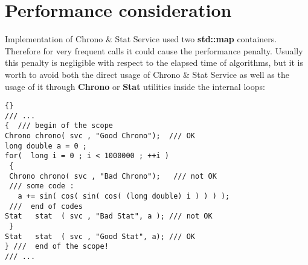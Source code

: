 \documentclass{lhcbnote}
\newcommand{\bftt}         {\ttfamily\bfseries}
\begin{document}
\chapter{Performance consideration  }
Implementation of Chrono \& Stat Service used two {\bftt{ std::map}}
containers. Therefore for very frequent calls it could cause the
performance penalty.  Usually this penalty  is negligible with respect to the
elapsed time of algorithms, but it is worth to avoid both the direct usage
of Chrono \& Stat Service as well as the  usage of it
through {\bftt{Chrono}} or {\bftt{Stat}} utilities inside the
internal loops:

\begin{lstlisting}{}
/// ...
{  /// begin of the scope
Chrono chrono( svc , "Good Chrono");  /// OK
long double a = 0 ;
for(  long i = 0 ; i < 1000000 ; ++i )
 {
 Chrono chrono( svc , "Bad Chrono");   /// not OK
 /// some code :
   a += sin( cos( sin( cos( (long double) i ) ) ) );
 ///  end of codes
Stat   stat  ( svc , "Bad Stat", a ); /// not OK
 }
Stat   stat  ( svc , "Good Stat", a); /// OK
} ///  end of the scope!
/// ...
\end{lstlisting}
\end{document}
